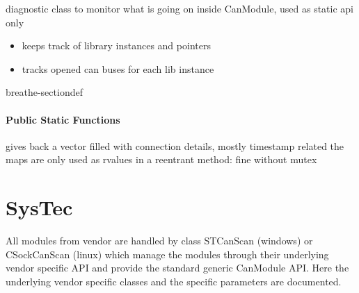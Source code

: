 \documentclass[a4paper,10pt,english]{sphinxmanual}
\begin{document}
\begin{fulllineitems}
\label{\detokenize{classestracing:_CPPv4N9CanModule4DiagE}}%
\pysigstartmultiline
{}%
\pysigstopmultiline
\sphinxAtStartPar
diagnostic class to monitor what is going on inside CanModule, used as static api only\begin{itemize}
\item {} 
\sphinxAtStartPar
keeps track of library instances and pointers

\item {} 
\sphinxAtStartPar
tracks opened can buses for each lib instance 

\end{itemize}


\begin{sphinxuseclass}{breathe-sectiondef}\subsubsection*{Public Static Functions}

\begin{fulllineitems}
\label{\detokenize{classestracing:_CPPv4N9CanModule4Diag15get_connectionsEv}}%
\pysigstartmultiline
{}%
\pysigstopmultiline
\sphinxAtStartPar
gives back a vector filled with connection details, mostly timestamp related the maps are only used as rvalues in a reentrant method: fine without mutex 

\end{fulllineitems}


\end{sphinxuseclass}
\end{fulllineitems}



\chapter{SysTec}
\label{\detokenize{vendors/systec:systec}}\label{\detokenize{vendors/systec::doc}}
\sphinxAtStartPar
All modules from vendor {\hyperref[\detokenize{vendors/systec:systec}]{}} are handled by class STCanScan (windows) or CSockCanScan (linux) which
manage the modules through their underlying vendor specific API and provide the standard generic CanModule API.
Here the underlying vendor specific classes and the specific parameters are documented.
\end{document}
